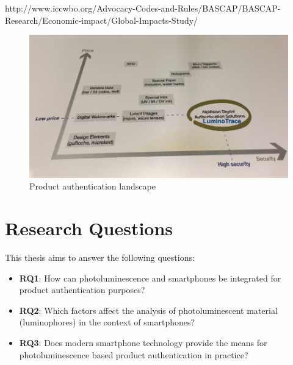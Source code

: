 \documentclass[thesis.tex]{subfiles}
\begin{document}

http://www.iccwbo.org/Advocacy-Codes-and-Rules/BASCAP/BASCAP-Research/Economic-impact/Global-Impacts-Study/
\begin{figure}[h!]
\centering \includegraphics[width=\linewidth]{images/landscape}
\caption{Product authentication landscape \label{fig:landscape}}
\end{figure}

\section{Research Questions}
\label{chapter:research-questions}

This thesis aims to answer the following questions:

\begin{itemize}
  \item \label{RQ1} \textbf{RQ1}: How can photoluminescence and smartphones be integrated for product authentication purposes?
  \item \label{RQ2} \textbf{RQ2}: Which factors affect the analysis of photoluminescent material (luminophores) in the context of smartphones?
  \item \label{RQ3} \textbf{RQ3}: Does modern smartphone technology provide the means for photoluminescence based product authentication in practice?
\end{itemize}
\end{document}
